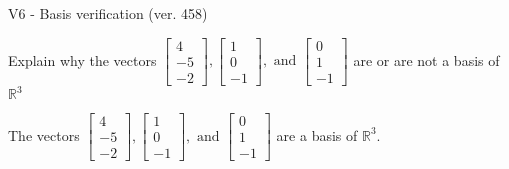 \begin{exercise}
  \begin{exerciseTitle}V6 - Basis verification (ver. 458)\end{exerciseTitle}
  \begin{exerciseStatement}
    Explain why the vectors \(\left[\begin{array}{r}
4 \\
-5 \\
-2
\end{array}\right] , \left[\begin{array}{r}
1 \\
0 \\
-1
\end{array}\right] , \text{ and } \left[\begin{array}{r}
0 \\
1 \\
-1
\end{array}\right]\) are or are not a basis of \(\mathbb{R}^3\)	


  \end{exerciseStatement}
  \begin{exerciseAnswer}
   The vectors \(\left[\begin{array}{r}
4 \\
-5 \\
-2
\end{array}\right] , \left[\begin{array}{r}
1 \\
0 \\
-1
\end{array}\right] , \text{ and } \left[\begin{array}{r}
0 \\
1 \\
-1
\end{array}\right]\) 
  	 are  a basis of \(\mathbb{R}^3\).
  


  \end{exerciseAnswer}
\end{exercise}
